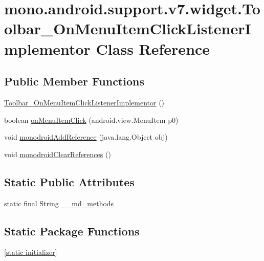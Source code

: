 \hypertarget{classmono_1_1android_1_1support_1_1v7_1_1widget_1_1_toolbar___on_menu_item_click_listener_implementor}{
\section{mono.android.support.v7.widget.Toolbar\_\-OnMenuItemClickListenerImplementor Class Reference}
\label{classmono_1_1android_1_1support_1_1v7_1_1widget_1_1_toolbar___on_menu_item_click_listener_implementor}
}
\subsection*{Public Member Functions}
\begin{CompactItemize}
\item 
\hyperlink{classmono_1_1android_1_1support_1_1v7_1_1widget_1_1_toolbar___on_menu_item_click_listener_implementor_27b55f61988eb3e7263eb9525631e109}{Toolbar\_\-OnMenuItemClickListenerImplementor} ()
\item 
boolean \hyperlink{classmono_1_1android_1_1support_1_1v7_1_1widget_1_1_toolbar___on_menu_item_click_listener_implementor_be3c4f78338e12e9652ab414b15582d9}{onMenuItemClick} (android.view.MenuItem p0)
\item 
void \hyperlink{classmono_1_1android_1_1support_1_1v7_1_1widget_1_1_toolbar___on_menu_item_click_listener_implementor_6c66afd38fc5d57a713c37f2059db0f0}{monodroidAddReference} (java.lang.Object obj)
\item 
void \hyperlink{classmono_1_1android_1_1support_1_1v7_1_1widget_1_1_toolbar___on_menu_item_click_listener_implementor_9e539eca7d6aaa4b43bd92a24f3ffe84}{monodroidClearReferences} ()
\end{CompactItemize}
\subsection*{Static Public Attributes}
\begin{CompactItemize}
\item 
static final String \hyperlink{classmono_1_1android_1_1support_1_1v7_1_1widget_1_1_toolbar___on_menu_item_click_listener_implementor_e2a6ab2c5121d74c0a12e594c68ddb43}{\_\-\_\-md\_\-methods}
\end{CompactItemize}
\subsection*{Static Package Functions}
\begin{CompactItemize}
\item 
\hyperlink{classmono_1_1android_1_1support_1_1v7_1_1widget_1_1_toolbar___on_menu_item_click_listener_implementor_1e42ad0025eafd48844fe0ec2d2bcbb7}{\mbox{[}static initializer\mbox{]}}
\end{CompactItemize}
